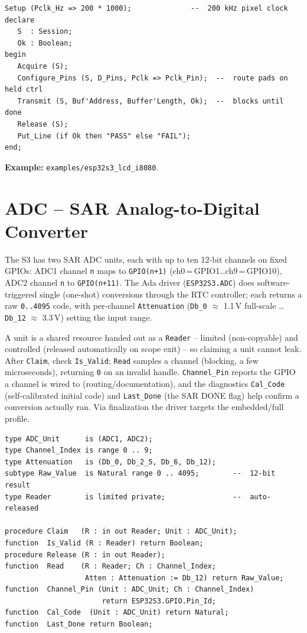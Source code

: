 \begin{lstlisting}
Setup (Pclk_Hz => 200 * 1000);              --  200 kHz pixel clock
declare
   S  : Session;
   Ok : Boolean;
begin
   Acquire (S);
   Configure_Pins (S, D_Pins, Pclk => Pclk_Pin);  --  route pads on held ctrl
   Transmit (S, Buf'Address, Buffer'Length, Ok);  --  blocks until done
   Release (S);
   Put_Line (if Ok then "PASS" else "FAIL");
end;
\end{lstlisting}

\noindent\textbf{Example:} \texttt{examples/esp32s3\_lcd\_i8080}.

\section{ADC -- SAR Analog-to-Digital Converter}
\label{app:int:adc}

The S3 has two SAR ADC units, each with up to ten 12-bit channels on fixed GPIOs:
ADC1 channel \texttt{n} maps to \texttt{GPIO(n+1)} (ch0\,=\,GPIO1\ldots ch9\,=\,GPIO10),
ADC2 channel \texttt{n} to \texttt{GPIO(n+11)}. The Ada driver
(\texttt{ESP32S3.ADC}) does software-triggered single (one-shot) conversions
through the RTC controller; each returns a raw \texttt{0..4095} code, with
per-channel \texttt{Attenuation} (\texttt{Db\_0} $\approx$ 1.1\,V full-scale
\ldots \texttt{Db\_12} $\approx$ 3.3\,V) setting the input range.

A unit is a shared resource handed out as a \texttt{Reader} -- limited
(non-copyable) and controlled (released automatically on scope exit) -- so
claiming a unit cannot leak. After \texttt{Claim}, check \texttt{Is\_Valid};
\texttt{Read} samples a channel (blocking, a few microseconds), returning
\texttt{0} on an invalid handle. \texttt{Channel\_Pin} reports the GPIO a channel
is wired to (routing/documentation), and the diagnostics \texttt{Cal\_Code}
(self-calibrated initial code) and \texttt{Last\_Done} (the SAR DONE flag) help
confirm a conversion actually ran. Via finalization the driver targets the
embedded/full profile.

\begin{lstlisting}
type ADC_Unit      is (ADC1, ADC2);
type Channel_Index is range 0 .. 9;
type Attenuation   is (Db_0, Db_2_5, Db_6, Db_12);
subtype Raw_Value  is Natural range 0 .. 4095;        --  12-bit result
type Reader        is limited private;                --  auto-released

procedure Claim   (R : in out Reader; Unit : ADC_Unit);
function  Is_Valid (R : Reader) return Boolean;
procedure Release (R : in out Reader);
function  Read    (R : Reader; Ch : Channel_Index;
                   Atten : Attenuation := Db_12) return Raw_Value;
function  Channel_Pin (Unit : ADC_Unit; Ch : Channel_Index)
                       return ESP32S3.GPIO.Pin_Id;
function  Cal_Code  (Unit : ADC_Unit) return Natural;
function  Last_Done return Boolean;
\end{lstlisting}

